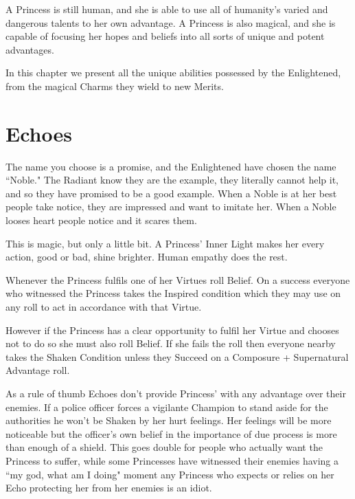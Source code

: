 
A Princess is still human, and she is able to use all of humanity's varied and dangerous talents to her own advantage. A Princess is also magical, and she is capable of focusing her hopes and beliefs into all sorts of unique and potent advantages. 

In this chapter we present all the unique abilities possessed by the Enlightened, from the magical Charms they wield to new Merits.


\section*{Echoes}

The name you choose is a promise, and the Enlightened have chosen the name \textquotedblleft Noble." The Radiant know they are the example, they literally cannot help it, and so they have promised to be a good example. When a Noble is at her best people take notice, they are impressed and want to imitate her. When a Noble looses heart people notice and it scares them.  

This is magic, but only a little bit. A Princess' Inner Light makes her every action, good or bad, shine brighter. Human empathy does the rest. 

Whenever the Princess fulfils one of her Virtues roll Belief. On a success everyone who witnessed the Princess takes the Inspired condition which they may use on any roll to act in accordance with that Virtue. 

However if the Princess has a clear opportunity to fulfil her Virtue and chooses not to do so she must also roll Belief. If she fails the roll then everyone nearby takes the Shaken Condition unless they Succeed on a Composure + Supernatural Advantage roll. 

As a rule of thumb Echoes don't provide Princess' with any advantage over their enemies. If a police officer forces a vigilante Champion to stand aside for the authorities he won't be Shaken by her hurt feelings. Her feelings will be more noticeable but the officer's own belief in the importance of due process is more than enough of a shield. This goes double for people who actually want the Princess to suffer, while some Princesses have witnessed their enemies having a \textquotedblleft my god, what am I doing" moment any Princess who expects or relies on her Echo protecting her from her enemies is an idiot. 

